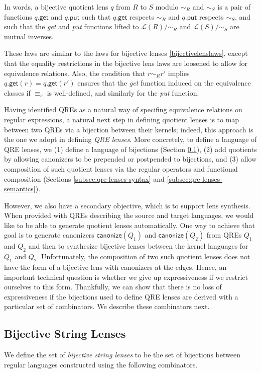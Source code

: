 \documentclass[acmsmall,review,anonymous]{acmart}
\newcommand{\codefont}[1]{\ensuremath{\mathsf{#1}}}
\newcommand{\kw}[1]{\codefont{#1}}
\newcommand{\canonize}{\ensuremath{\kw{canonize}}}
\newcommand{\get}{\ensuremath{\kw{get}}}
\newcommand{\lput}{\ensuremath{\kw{put}}}
\begin{document}
In words, a bijective quotient lens $q$ from $R$ to $S$ modulo $\sim_R$
and $\sim_S$ is a pair of functions $q.\get$ and $q.\lput$ such that
$q.\get$ respects $\sim_R$ and $q.\lput$ respects $\sim_S$, and such that
the {\em get} and {\em put} functions lifted to $\mathcal{L}(R)/{\sim_R}$ and
$\mathcal{L}(S)/{\sim_S}$ are mutual inverses.

These laws are similar to the laws for bijective lenses
\cref{bijectivelenslaws}, except that the  equality restrictions in the
bijective lens laws are loosened to allow for equivalence relations. Also, the
condition that $r \sim_R r'$ implies $q.\get(r) = q.\get(r')$ ensures that the
{\em get} function induced on the equivalence classes if $\equiv_c$ is
well-defined, and similarly for the {\em put} function. 

Having identified QREs as a natural way of specifing equivalence relations on
regular expressions, a natural next step in defining quotient lenses is to map
between two QREs via a bijection between their kernels; indeed, this approach
is the one we adopt in defining {\em QRE lenses}.
More concretely, to define a language of QRE lenses, we
(1) define a language of bijections (Section \ref{subsec:bijective-lenses}),
(2) add quotients by allowing canonizers to be prepended or postpended
to bijections, and 
(3) allow composition of such quotient lenses via the
regular operators and functional composition
(Sections \ref{subsec:qre-lenses-syntax} and \ref{subsec:qre-lenses-semantics}).

However, we also have a secondary objective, which is to support lens
synthesis. When provided with QREs describing the source and target
languages, we would like to be able to generate quotient lenses
automatically. One way to achieve that goal is to generate canonizers
$\canonize(Q_1)$ and $\canonize(Q_2)$ from QREs $Q_1$ and $Q_2$ and
then to synthesize bijective lenses between the kernel languages for
$Q_1$ and $Q_2$.
Unfortunately, the composition of two such quotient lenses does not have 
the form of a bijective lens with canonizers at the edges. Hence, an important
technical question is whether we give up expressiveness if we restrict
ourselves to this form. 
Thankfully, we can show that there is no loss of expressiveness if
the bijections used to define QRE lenses are derived with a particular
set of combinators.  We describe these combinators next.

\subsection{Bijective String Lenses}
\label{subsec:bijective-lenses}
We define the set of \textit{bijective string lenses} to be the set of
bijections between regular languages constructed using the following combinators.
\end{document}
